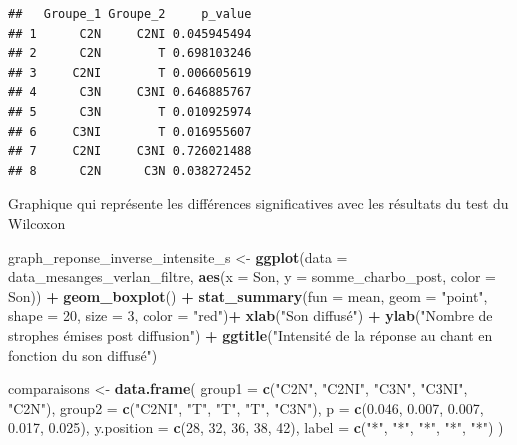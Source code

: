 \documentclass[
  french,
]{article}
\newenvironment{Shaded}{\begin{snugshade}}{\end{snugshade}}
\newcommand{\AttributeTok}[1]{\textcolor[rgb]{0.13,0.29,0.53}{#1}}
\newcommand{\DecValTok}[1]{\textcolor[rgb]{0.00,0.00,0.81}{#1}}
\newcommand{\FloatTok}[1]{\textcolor[rgb]{0.00,0.00,0.81}{#1}}
\newcommand{\FunctionTok}[1]{\textcolor[rgb]{0.13,0.29,0.53}{\textbf{#1}}}
\newcommand{\NormalTok}[1]{#1}
\newcommand{\OtherTok}[1]{\textcolor[rgb]{0.56,0.35,0.01}{#1}}
\newcommand{\SpecialCharTok}[1]{\textcolor[rgb]{0.81,0.36,0.00}{\textbf{#1}}}
\newcommand{\StringTok}[1]{\textcolor[rgb]{0.31,0.60,0.02}{#1}}
\begin{document}
\begin{verbatim}
##   Groupe_1 Groupe_2     p_value
## 1      C2N     C2NI 0.045945494
## 2      C2N        T 0.698103246
## 3     C2NI        T 0.006605619
## 4      C3N     C3NI 0.646885767
## 5      C3N        T 0.010925974
## 6     C3NI        T 0.016955607
## 7     C2NI     C3NI 0.726021488
## 8      C2N      C3N 0.038272452
\end{verbatim}

Graphique qui représente les différences significatives avec les
résultats du test du Wilcoxon

\begin{Shaded}
\begin{Highlighting}[]
\NormalTok{graph\_reponse\_inverse\_intensite\_s }\OtherTok{\textless{}{-}} \FunctionTok{ggplot}\NormalTok{(}\AttributeTok{data =}\NormalTok{ data\_mesanges\_verlan\_filtre, }
                                            \FunctionTok{aes}\NormalTok{(}\AttributeTok{x =}\NormalTok{ Son, }\AttributeTok{y =}\NormalTok{ somme\_charbo\_post, }\AttributeTok{color =}\NormalTok{ Son)) }\SpecialCharTok{+}
  \FunctionTok{geom\_boxplot}\NormalTok{() }\SpecialCharTok{+}
  \FunctionTok{stat\_summary}\NormalTok{(}\AttributeTok{fun =}\NormalTok{ mean, }\AttributeTok{geom =} \StringTok{"point"}\NormalTok{, }\AttributeTok{shape =} \DecValTok{20}\NormalTok{, }\AttributeTok{size =} \DecValTok{3}\NormalTok{, }\AttributeTok{color =} \StringTok{"red"}\NormalTok{)}\SpecialCharTok{+}
  \FunctionTok{xlab}\NormalTok{(}\StringTok{"Son diffusé"}\NormalTok{) }\SpecialCharTok{+} 
  \FunctionTok{ylab}\NormalTok{(}\StringTok{"Nombre de strophes émises post diffusion"}\NormalTok{) }\SpecialCharTok{+}  
  \FunctionTok{ggtitle}\NormalTok{(}\StringTok{"Intensité de la réponse au chant en fonction du son diffusé"}\NormalTok{)}


\NormalTok{comparaisons }\OtherTok{\textless{}{-}} \FunctionTok{data.frame}\NormalTok{(}
  \AttributeTok{group1 =} \FunctionTok{c}\NormalTok{(}\StringTok{"C2N"}\NormalTok{, }\StringTok{"C2NI"}\NormalTok{, }\StringTok{"C3N"}\NormalTok{, }\StringTok{"C3NI"}\NormalTok{,  }\StringTok{"C2N"}\NormalTok{),}
  \AttributeTok{group2 =} \FunctionTok{c}\NormalTok{(}\StringTok{"C2NI"}\NormalTok{, }\StringTok{"T"}\NormalTok{, }\StringTok{"T"}\NormalTok{, }\StringTok{"T"}\NormalTok{,  }\StringTok{"C3N"}\NormalTok{),}
  \AttributeTok{p =} \FunctionTok{c}\NormalTok{(}\FloatTok{0.046}\NormalTok{,  }\FloatTok{0.007}\NormalTok{, }\FloatTok{0.007}\NormalTok{, }\FloatTok{0.017}\NormalTok{, }\FloatTok{0.025}\NormalTok{),  }
  \AttributeTok{y.position =} \FunctionTok{c}\NormalTok{(}\DecValTok{28}\NormalTok{,  }\DecValTok{32}\NormalTok{, }\DecValTok{36}\NormalTok{, }\DecValTok{38}\NormalTok{, }\DecValTok{42}\NormalTok{),}
  \AttributeTok{label =} \FunctionTok{c}\NormalTok{(}\StringTok{"*"}\NormalTok{, }\StringTok{"*"}\NormalTok{, }\StringTok{"*"}\NormalTok{, }\StringTok{"*"}\NormalTok{, }\StringTok{"*"}\NormalTok{)  }
\NormalTok{)}


\end{Highlighting}
\end{Shaded}
\end{document}
